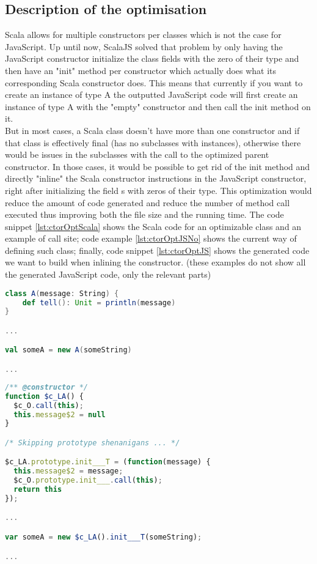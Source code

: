 \subsection{Description of the optimisation}
Scala allows for multiple constructors per classes which is not the case for
JavaScript. Up until now, ScalaJS solved that problem by only having the
JavaScript constructor initialize the class fields with the zero of their type
and then have an "init" method per constructor which actually does what its
corresponding Scala constructor does. This means that currently if you want to
create an instance of type A the outputted JavaScript code will first create an
instance of type A with the "empty" constructor and then call the init method
on it. \\
But in most cases, a Scala class doesn't have more than one constructor and if
that class is effectively final (has no subclasses with instances), otherwise
there would be issues in the subclasses with the call to the optimized parent
constructor. In those cases, it would be possible to get rid of the init method
and directly "inline" the Scala constructor instructions in the JavaScript
constructor, right after initializing the field s with zeros of their type.
This optimization would reduce the amount of code generated and reduce the
number of method call executed thus improving both the file size and the
running time. The code snippet \ref{lst:ctorOptScala} shows the Scala code for
an optimizable class and an example of call site; code example
\ref{lst:ctorOptJSNo} shows the current way of defining such class; finally,
code snippet \ref{lst:ctorOptJS} shows the generated code we want to build when
inlining the constructor. (these examples do not show all the generated
JavaScript code, only the relevant parts)

\begin{lstlisting}[language=scala,caption=Example Scala Code.,
label={lst:ctorOptScala}]
class A(message: String) {
    def tell(): Unit = println(message)
}

...

val someA = new A(someString)

...

\end{lstlisting}
\begin{lstlisting}[language=javascript,caption=Generated JavaScript without
optimisation., label={lst:ctorOptJSNo}]
/** @constructor */
function $c_LA() {
  $c_O.call(this);
  this.message$2 = null
}

/* Skipping prototype shenanigans ... */

$c_LA.prototype.init___T = (function(message) {
  this.message$2 = message;
  $c_O.prototype.init___.call(this);
  return this
});

...

var someA = new $c_LA().init___T(someString);

...

\end{lstlisting}

